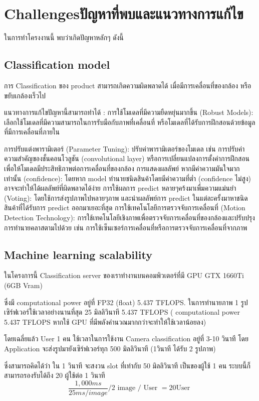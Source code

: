  
\section{\ifenglish Challenges\else ปัญหาที่พบและแนวทางการแก้ไข\fi}
ในการทำโครงงานนี้ พบว่าเกิดปัญหาหลักๆ ดังนี้
\subsection{Classification model}
 

การ Classification ของ product สามารถเกิดความผิดพลาดได้ เมื่อมีการเคลื่อนที่ของกล้อง หรือขยับเกล้องเร็วไป

แนวทางการแก้ไขปัญหานี้สามารถทำได้ :
การใช้โมเดลที่มีความยืดหยุ่นมากขึ้น (Robust Models): เลือกใช้โมเดลที่มีความสามารถในการรับมือกับภาพที่เคลื่อนที่ หรือโมเดลที่ได้รับการฝึกสอนด้วยข้อมูลที่มีการเคลื่อนที่ภายใน

การปรับแต่งพารามิเตอร์ (Parameter Tuning): ปรับค่าพารามิเตอร์ของโมเดล เช่น การปรับค่าความสำคัญของชั้นคอนโวลูชัน (convolutional layer) หรือการเปลี่ยนแปลงการตั้งค่าการฝึกสอนเพื่อให้โมเดลมีประสิทธิภาพต่อการเคลื่อนที่ของกล้อง
การแสดงผลลัพย์ หากมีค่าความมันใจมากเท่านั้น  (confidence): โดยหาก model ทำนายชนิดสินค้าโดยมีค่าความที่ต่ำ (confidence ไม่สูง) อาจจะทำให้ได้ผลลัพย์ที่ผิดพลาดได้ง่าย
การใช้ผลการ predict หลายๆคร้งมาเพื่มความแม่นยำ (Voting): โดยใช้การส่งรูปภาพไปหลายๆภาพ และนำผลลัพย์การ predict ในแต่ละครั้งมาหาชนิดสินค้าที่ได้รับการ predict ออกมาเยอะที่สุด
การใช้เทคโนโลยีการตรวจจับการเคลื่อนที่ (Motion Detection Technology): การใช้เทคโนโลยีเชิงภาพเพื่อตรวจจับการเคลื่อนที่ของกล้องและปรับปรุงการทำนายคลาสตามไปด้วย เช่น การใช้เซ็นเซอร์การเคลื่อนที่หรือการตรวจจับการเคลื่อนที่จากภาพ
 
\subsection{Machine learning scalability}


ในโครงการนี้ Classification server ของเราทำงานบนคอมพิวเตอร์ที่มี GPU GTX 1660Ti (6GB Vram)

ซึ่งมี  computational power อยู่ที่ FP32 (float) 5.437 TFLOPS.
ในการทำนายภาพ 1 รูป เซิร์ฟเวอร์ใช้เวลาอย่างนานที่สุด 25 มิลลิวินาที
5.437 TFLOPS ( computational power 5.437 TFLOPS หากใช้ GPU ที่มีพลังคำนวณมากกว่าจะทำให้ใช้เวลาน้อยลง)

โดยเฉลี่ยแล้ว User 1 คน ใช้เวลาในการใช้งาน Camera classification อยู่ที่ 3-10 วินาที
โดย Application จะส่งรูปมายังเซิร์ฟเวอร์ทุก 500 มิลลิวินาที (1วินาที ได้รับ 2 รูปภาพ)

ซึ่งสามารถคิดได้ว่า ใน 1 วินาที จะสงวน slot ที่เท่ากับ 50 มิลลิวินาที เป็นของผู้ใช้ 1 คน 
ระบบนี้ก็สามารถรองรับได้ถึง 20 ผู้ใช้ต่อ 1 วินาที
\begin{equation}
    {\frac {1,000 ms}{25 ms / image}}   / 2 \text{ image / User }  = 20 \text{User }
\end{equation}

